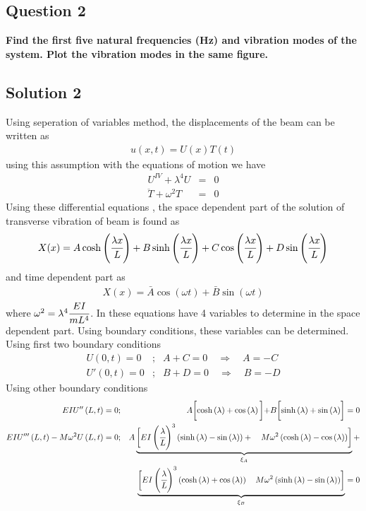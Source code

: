 \documentclass[]{report}
\begin{document}
\subsection*{Question 2}
\textbf{Find the first five natural frequencies (Hz) and vibration modes of the system. Plot the vibration modes in the same figure.}
\begin{center}
\subsection*{Solution 2}
\end{center}
Using seperation of variables method, the displacements of the beam can be written as
\begin{eqnarray*}
u\left(x,t\right)=U\left(x\right)T\left(t\right)
\end{eqnarray*}
using this assumption with the equations of motion we have
\begin{eqnarray*}
U^{IV} +\lambda^4U&=&0\\
\ddot{T} +\omega^2 T&=&0
\end{eqnarray*}
Using these differential equations , the space dependent part of the solution of transverse vibration of beam is found as
\begin{eqnarray*}
X(x)=A\cosh\left(\cfrac{\lambda x}{L}\right)+B\sinh\left(\cfrac{\lambda x}{L}\right)+C\cos\left(\cfrac{\lambda x}{L}\right)+D\sin\left(\cfrac{\lambda x}{L}\right)
\end{eqnarray*}
and time dependent part as
\begin{eqnarray*}
X(x)=\bar{A}\cos\left({\omega t}\right)+\bar{B}\sin\left({\omega t}\right)
\end{eqnarray*}
where $\omega^2=\lambda^4 \cfrac{EI}{mL^4}$. In these equations have 4 variables to determine in the space dependent part. Using boundary conditions, these variables can be determined. Using first two boundary conditions
\begin{eqnarray*}
U\left(0,t\right)= 0 &;&  A+C=0 \quad \Longrightarrow \quad A=-C\\
U'\left(0,t\right)= 0&;& B+D=0 \quad \Longrightarrow \quad B=-D
\end{eqnarray*}
Using other boundary conditions
\begin{eqnarray*}
EIU''\left(L,t\right)= 0&;& A\biggl[\cosh\left(\lambda \right)+\cos\left(\lambda \right)\biggl]+
B\biggl[\sinh\left(\lambda \right)+\sin\left(\lambda \right)\biggr]=0\\
EIU'''\left(L,t\right)-M\omega^2U\left(L,t\right)= 0&;& A\underbrace{\biggl[EI\left(\cfrac{\lambda}{L}\right)^3\left(\sinh\left(\lambda \right)-\sin\left(\lambda \right)\right)+ \quad M\omega^2\left(\cosh\left(\lambda \right)-\cos\left(\lambda \right)\right)\biggr]}_{\xi_A}+\\
&&
\underbrace{\biggl[EI\left(\cfrac{\lambda}{L}\right)^3\left(\cosh\left(\lambda \right)+\cos\left(\lambda \right)\right) \quad M\omega^2\left(\sinh\left(\lambda \right)-\sin\left(\lambda \right)\right)\biggr]}_{\xi_B}=0
\end{eqnarray*}
\end{document}
